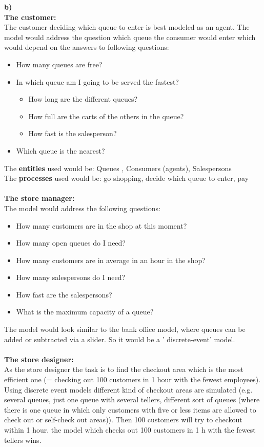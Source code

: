 \textbf{b)}\\
\textbf{The customer:}\\
The customer deciding which queue to enter is best modeled as an agent. The model would address the question which queue the consumer would enter which would depend on the answers to following questions:
\begin{itemize}
  \item How many queues are free?
  \item In which queue am I going to be served the fastest? 
  		\begin{itemize}
  		  \item How long are the different queues?
  		  \item How full are the carts of the others in the queue?
  		  \item How fast is the salesperson?		  
		\end{itemize}
  \item Which queue is the nearest?
\end{itemize}
The \textbf{entities} used would be: Queues , Consumers (agents), Salespersons\\
The \textbf{processes} used would be: go shopping, decide which queue to enter, pay\\\\
\textbf{The store manager:}\\
The model would address the following questions:
\begin{itemize}
  \item How many customers are in the shop at this moment?
    \item How many open queues do I need?
      \item How many customers are in average  in an hour in the shop?
        \item How many salespersons do I need? 
        \item How fast are the salespersons?
        \item What is the maximum capacity of a queue?
\end{itemize}
The model would look similar to the bank office model, where queues can be added or subtracted via a slider. So it would be a ' discrete-event' model.\\\\
\textbf{The store designer:}\\
As the store designer the task is to find the checkout area which is the most efficient one 
(= checking out 100 customers in 1 hour with the fewest employees). Using discrete event models different
kind of checkout areas are simulated (e.g. several queues, just one queue with several tellers, different
sort of queues (where there is one queue in which only customers with five or less items are allowed to check out 
or self-check out areas)). Then 100 customers will try to checkout within 1 hour. the model which checks out 100 customers in 1 h with the fewest tellers wins.

